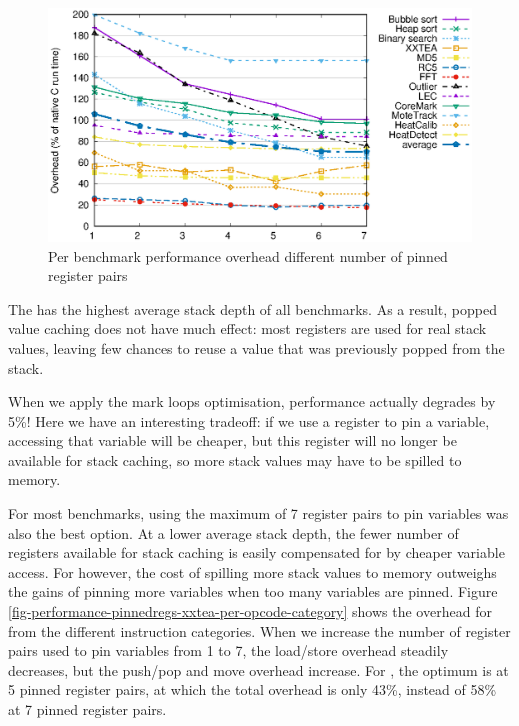 \begin{figure}
\centering
\includegraphics[width=\mygraphsize]{pinnedregs-performance-all-benchmarks.eps}
\caption{Per benchmark performance overhead different number of pinned register pairs}
\label{fig-performance-pinnedregs-per-benchmark}
\end{figure}

The  has the highest average stack depth of all benchmarks. As a result, popped value caching does not have much effect: most registers are used for real stack values, leaving few chances to reuse a value that was previously popped from the stack. 

When we apply the mark loops optimisation, performance actually degrades by 5\%! Here we have an interesting tradeoff: if we use a register to pin a variable, accessing that variable will be cheaper, but this register will no longer be available for stack caching, so more stack values may have to be spilled to memory.

For most benchmarks, using the maximum of 7 register pairs to pin variables was also the best option. At a lower average stack depth, the fewer number of registers available for stack caching is easily compensated for by cheaper variable access. For  however, the cost of spilling more stack values to memory outweighs the gains of pinning more variables when too many variables are pinned. Figure \ref{fig-performance-pinnedregs-xxtea-per-opcode-category} shows the overhead for  from the different instruction categories. When we increase the number of register pairs used to pin variables from 1 to 7, the load/store overhead steadily decreases, but the push/pop and move overhead increase. For , the optimum is at 5 pinned register pairs, at which the total overhead is only 43\%, instead of 58\% at 7 pinned register pairs.

